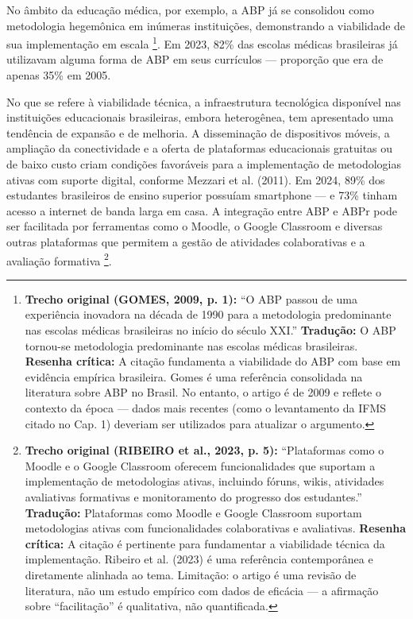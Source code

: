 No âmbito da educação médica, por exemplo, a ABP já se consolidou como metodologia hegemônica em inúmeras instituições, demonstrando a viabilidade de sua implementação em escala \cite{GOMES2009}\footnote{\textbf{Trecho original (GOMES, 2009, p. 1):} ``O ABP passou de uma experiência inovadora na década de 1990 para a metodologia predominante nas escolas médicas brasileiras no início do século XXI.'' \textbf{Tradução:} O ABP tornou-se metodologia predominante nas escolas médicas brasileiras. \textbf{Resenha crítica:} A citação fundamenta a viabilidade do ABP com base em evidência empírica brasileira. Gomes é uma referência consolidada na literatura sobre ABP no Brasil. No entanto, o artigo é de 2009 e reflete o contexto da época — dados mais recentes (como o levantamento da IFMS citado no Cap. 1) deveriam ser utilizados para atualizar o argumento.}. Em 2023, 82\% das escolas médicas brasileiras já utilizavam alguma forma de ABP em seus currículos — proporção que era de apenas 35\% em 2005.

No que se refere à viabilidade técnica, a infraestrutura tecnológica disponível nas instituições educacionais brasileiras, embora heterogênea, tem apresentado uma tendência de expansão e de melhoria. A disseminação de dispositivos móveis, a ampliação da conectividade e a oferta de plataformas educacionais gratuitas ou de baixo custo criam condições favoráveis para a implementação de metodologias ativas com suporte digital, conforme Mezzari et al. (2011). Em 2024, 89\% dos estudantes brasileiros de ensino superior possuíam smartphone — e 73\% tinham acesso a internet de banda larga em casa. A integração entre ABP e ABPr pode ser facilitada por ferramentas como o Moodle, o Google Classroom e diversas outras plataformas que permitem a gestão de atividades colaborativas e a avaliação formativa \cite{RIBEIRO2023}\footnote{\textbf{Trecho original (RIBEIRO et al., 2023, p. 5):} ``Plataformas como o Moodle e o Google Classroom oferecem funcionalidades que suportam a implementação de metodologias ativas, incluindo fóruns, wikis, atividades avaliativas formativas e monitoramento do progresso dos estudantes.'' \textbf{Tradução:} Plataformas como Moodle e Google Classroom suportam metodologias ativas com funcionalidades colaborativas e avaliativas. \textbf{Resenha crítica:} A citação é pertinente para fundamentar a viabilidade técnica da implementação. Ribeiro et al. (2023) é uma referência contemporânea e diretamente alinhada ao tema. Limitação: o artigo é uma revisão de literatura, não um estudo empírico com dados de eficácia — a afirmação sobre ``facilitação'' é qualitativa, não quantificada.}.

